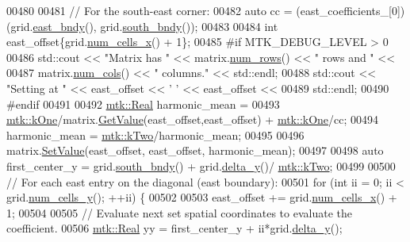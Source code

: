 \begin{DoxyCode}
00480 
00481   \textcolor{comment}{// For the south-east corner:}
00482   \textcolor{keyword}{auto} cc = (east\_coefficients\_[0])(grid.\hyperlink{classmtk_1_1UniStgGrid2D_a03f689eb29a6369b82ce1207c655d5ff}{east\_bndy}(), grid.\hyperlink{classmtk_1_1UniStgGrid2D_a1442eaf219f099d0ebf46a170fdebf92}{south\_bndy}());
00483 
00484   \textcolor{keywordtype}{int} east\_offset\{grid.\hyperlink{classmtk_1_1UniStgGrid2D_a2d182866a398aba8e4829590e85bf939}{num\_cells\_x}() + 1\};
00485 \textcolor{preprocessor}{  #if MTK\_DEBUG\_LEVEL > 0}
00486   std::cout << \textcolor{stringliteral}{"Matrix has "} << matrix.\hyperlink{classmtk_1_1DenseMatrix_a53f3afb3b6a8d21854458aaa9663cc74}{num\_rows}() << \textcolor{stringliteral}{" rows and "} <<
00487     matrix.\hyperlink{classmtk_1_1DenseMatrix_a41747502d468c6728a4be31501b16e0e}{num\_cols}() << \textcolor{stringliteral}{" columns."} << std::endl;
00488   std::cout << \textcolor{stringliteral}{"Setting at "} << east\_offset << \textcolor{charliteral}{' '} << east\_offset <<
00489     std::endl;
00490 \textcolor{preprocessor}{  #endif}
00491 
00492   \hyperlink{group__c01-roots_gac080bbbf5cbb5502c9f00405f894857d}{mtk::Real} harmonic\_mean =
00493     \hyperlink{group__c01-roots_ga26407c24d43b6b95480943340d285c71}{mtk::kOne}/matrix.\hyperlink{classmtk_1_1DenseMatrix_a4b23ecbebd970b5eea915dbb50691024}{GetValue}(east\_offset,east\_offset) + 
      \hyperlink{group__c01-roots_ga26407c24d43b6b95480943340d285c71}{mtk::kOne}/cc;
00494   harmonic\_mean = \hyperlink{group__c01-roots_gaf39c2d851a2db744f4feb1c5ab3ec2cf}{mtk::kTwo}/harmonic\_mean;
00495 
00496   matrix.\hyperlink{classmtk_1_1DenseMatrix_a784ce5784109ac86bfb9d8562b334b13}{SetValue}(east\_offset, east\_offset, harmonic\_mean);
00497 
00498   \textcolor{keyword}{auto} first\_center\_y = grid.\hyperlink{classmtk_1_1UniStgGrid2D_a1442eaf219f099d0ebf46a170fdebf92}{south\_bndy}() + grid.\hyperlink{classmtk_1_1UniStgGrid2D_a65a78cfc80ffdbeb282ed57af4dc5cb4}{delta\_y}()/
      \hyperlink{group__c01-roots_gaf39c2d851a2db744f4feb1c5ab3ec2cf}{mtk::kTwo};
00499 
00500   \textcolor{comment}{// For each east entry on the diagonal (east boundary):}
00501   \textcolor{keywordflow}{for} (\textcolor{keywordtype}{int} ii = 0; ii < grid.\hyperlink{classmtk_1_1UniStgGrid2D_aed05a801cc9a76dba0ff203cea58a61a}{num\_cells\_y}(); ++ii) \{
00502 
00503     east\_offset += grid.\hyperlink{classmtk_1_1UniStgGrid2D_a2d182866a398aba8e4829590e85bf939}{num\_cells\_x}() + 1;
00504 
00505     \textcolor{comment}{// Evaluate next set spatial coordinates to evaluate the coefficient.}
00506     \hyperlink{group__c01-roots_gac080bbbf5cbb5502c9f00405f894857d}{mtk::Real} yy = first\_center\_y + ii*grid.\hyperlink{classmtk_1_1UniStgGrid2D_a65a78cfc80ffdbeb282ed57af4dc5cb4}{delta\_y}();

\end{DoxyCode}
